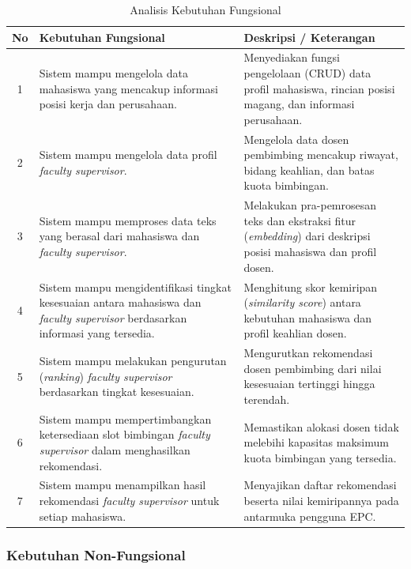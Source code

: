 \begin{table}[htbp]
\centering
\caption{Analisis Kebutuhan Fungsional}
\label{tab:kebutuhan-fungsional}
\begin{tabular}{|c|p{4.5cm}|p{7.5cm}|}
\hline
\textbf{No} & \textbf{Kebutuhan Fungsional} & \textbf{Deskripsi / Keterangan} \\ \hline
1 & Sistem mampu mengelola data mahasiswa yang mencakup informasi posisi kerja dan perusahaan. & Menyediakan fungsi pengelolaan (CRUD) data profil mahasiswa, rincian posisi magang, dan informasi perusahaan. \\ \hline
2 & Sistem mampu mengelola data profil \textit{faculty supervisor}. & Mengelola data dosen pembimbing mencakup riwayat, bidang keahlian, dan batas kuota bimbingan. \\ \hline
3 & Sistem mampu memproses data teks yang berasal dari mahasiswa dan \textit{faculty supervisor}. & Melakukan pra-pemrosesan teks dan ekstraksi fitur (\textit{embedding}) dari deskripsi posisi mahasiswa dan profil dosen. \\ \hline
4 & Sistem mampu mengidentifikasi tingkat kesesuaian antara mahasiswa dan \textit{faculty supervisor} berdasarkan informasi yang tersedia. & Menghitung skor kemiripan (\textit{similarity score}) antara kebutuhan mahasiswa dan profil keahlian dosen. \\ \hline
5 & Sistem mampu melakukan pengurutan (\textit{ranking}) \textit{faculty supervisor} berdasarkan tingkat kesesuaian. & Mengurutkan rekomendasi dosen pembimbing dari nilai kesesuaian tertinggi hingga terendah. \\ \hline
6 & Sistem mampu mempertimbangkan ketersediaan slot bimbingan \textit{faculty supervisor} dalam menghasilkan rekomendasi. & Memastikan alokasi dosen tidak melebihi kapasitas maksimum kuota bimbingan yang tersedia. \\ \hline
7 & Sistem mampu menampilkan hasil rekomendasi \textit{faculty supervisor} untuk setiap mahasiswa. & Menyajikan daftar rekomendasi beserta nilai kemiripannya pada antarmuka pengguna EPC. \\ \hline
\end{tabular}
\end{table}

\subsubsection{Kebutuhan Non-Fungsional}

